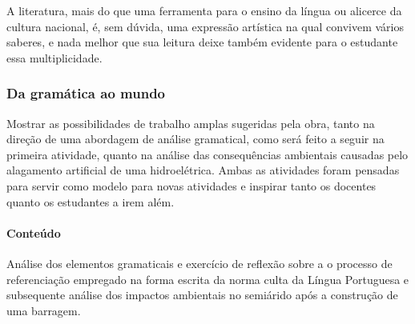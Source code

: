 \documentclass[12pt]{extarticle}
\begin{document}
  A literatura, mais do que uma ferramenta para o ensino da língua ou
  alicerce da cultura nacional, é, sem dúvida, uma expressão artística
  na qual convivem vários saberes, e nada melhor que sua leitura deixe
  também evidente para o estudante essa multiplicidade.

\subsubsection{Da gramática ao mundo}

  Mostrar as possibilidades de trabalho amplas sugeridas pela obra,
  tanto na direção de uma abordagem de análise gramatical, como será
  feito a seguir na primeira atividade, quanto na análise das
  consequências ambientais causadas pelo alagamento artificial de uma
  hidroelétrica. Ambas as atividades foram pensadas para servir como
  modelo para novas atividades e inspirar tanto os docentes quanto os
  estudantes a irem além.

\paragraph{Conteúdo}
  Análise dos elementos gramaticais e exercício de reflexão sobre a o
  processo de referenciação empregado na forma escrita da norma culta da
  Língua Portuguesa e subsequente análise dos impactos ambientais no
  semiárido após a construção de uma barragem.
\end{document}
